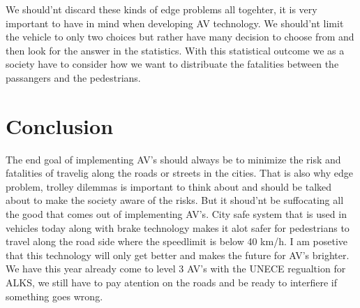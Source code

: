 \documentclass[conference]{IEEEtran}
\begin{document}
		We should'nt discard these kinds of edge problems all togehter, it is very important to have in mind when developing AV technology. We should'nt limit the 
		vehicle to only two choices but rather have many decision to choose from and then look for the answer in the statistics. With this statistical outcome we as 
		a society have to consider how we want to distribuate the fatalities between the passangers and the pedestrians.
		

 


\section{Conclusion}
	The end goal of implementing AV's should always be to minimize the risk and fatalities of travelig along the roads or streets in the cities. That is also why 
	edge problem, trolley dilemmas is important to think about and should be talked about to make the society aware of the risks. But it shoud'nt be suffocating all
	the good that comes out of implementing AV's. City safe system that is used in vehicles today along with brake technology makes it alot safer for pedestrians to 
	travel along the road side where the speedlimit is below 40 km/h. I am posetive that this technology will only get better and makes the future for AV's brighter.
	We have this year already come to level 3 AV's with the UNECE regualtion for ALKS, we still have to pay atention on the roads and be ready to interfiere if something
	goes wrong.  




\end{document}
